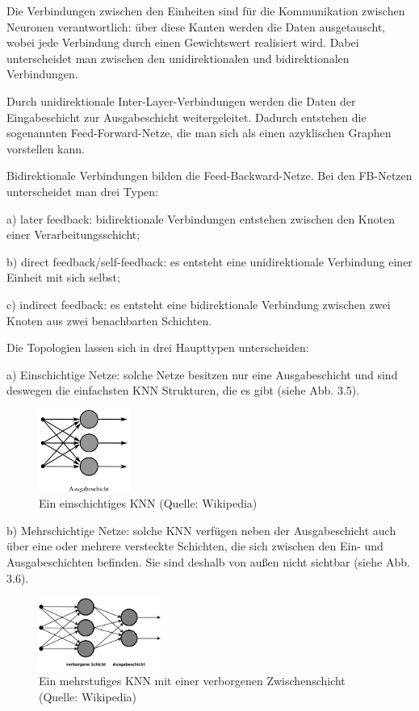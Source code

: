 Die Verbindungen zwischen den Einheiten sind für die Kommunikation zwischen Neuronen verantwortlich: über diese Kanten werden die Daten ausgetauscht, wobei jede Verbindung durch einen Gewichtswert realisiert wird. Dabei unterscheidet man zwischen den unidirektionalen und bidirektionalen Verbindungen.

Durch unidirektionale Inter-Layer-Verbindungen werden die Daten der Eingabeschicht zur Ausgabeschicht weitergeleitet. Dadurch entstehen die sogenannten Feed-Forward-Netze, die man sich als einen azyklischen Graphen vorstellen kann.

Bidirektionale Verbindungen bilden die Feed-Backward-Netze. Bei den FB-Netzen unterscheidet man drei Typen:

a) later feedback: bidirektionale Verbindungen entstehen zwischen den Knoten einer Verarbeitungsschicht;

b) direct feedback/self-feedback: es entsteht eine unidirektionale Verbindung einer Einheit mit sich selbst;

c) indirect feedback: es entsteht eine bidirektionale Verbindung zwischen zwei Knoten aus zwei benachbarten Schichten.

Die Topologien lassen sich in drei Haupttypen unterscheiden:

a) Einschichtige Netze: solche Netze besitzen nur eine Ausgabeschicht und sind deswegen die einfachsten KNN Strukturen, die es gibt (siehe Abb. 3.5).

\begin{figure}[h]
\centering
\includegraphics[width=3cm]{chapters/neural_networks/single.jpg}

\caption{Ein einschichtiges KNN (Quelle: Wikipedia)}
	\label{img:single}
\end{figure}


b) Mehrschichtige Netze: solche KNN verfügen neben der Ausgabeschicht auch über eine oder mehrere versteckte Schichten, die sich zwischen den Ein- und Ausgabeschichten befinden. Sie sind deshalb von außen nicht sichtbar (siehe Abb. 3.6).

\begin{figure}[h]
\centering
\includegraphics[width=4cm]{chapters/neural_networks/multilayer.jpg}

\caption{Ein mehrstufiges KNN mit einer verborgenen Zwischenschicht (Quelle: Wikipedia)}
	\label{img:multi}
\end{figure}

